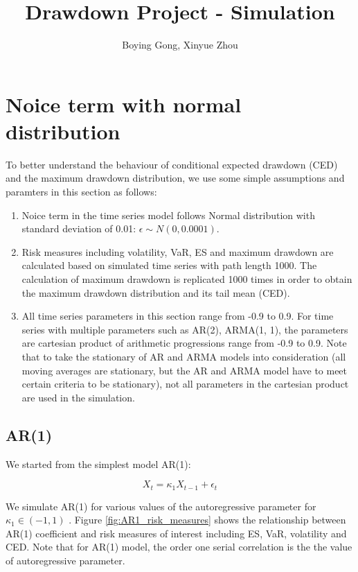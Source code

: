 \documentclass[11pt]{article}
\title{Drawdown Project - Simulation}
\author{Boying Gong, Xinyue Zhou}
\begin{document}
\maketitle

\tableofcontents

\clearpage

\section{Noice term with normal distribution}

To better understand the behaviour of conditional expected drawdown (CED) and the maximum drawdown distribution, we use some simple assumptions and paramters in this section as follows:

\begin{enumerate}
\item Noice term in the time series model follows Normal distribution with standard deviation of 0.01: $\epsilon \sim N(0, 0.0001)$.
\item Risk measures including volatility, VaR, ES and maximum drawdown are calculated based on simulated time series with path length 1000. The calculation of maximum drawdown is replicated 1000 times in order to obtain the maximum drawdown distribution and its tail mean (CED).
\item All time series parameters in this section range from -0.9 to 0.9. For time series with multiple parameters such as AR(2), ARMA(1, 1), the parameters are cartesian product of arithmetic progressions range from -0.9 to 0.9. Note that to take the stationary of AR and ARMA models into consideration (all moving averages are stationary, but the AR and ARMA model have to meet certain criteria to be stationary), not all parameters in the cartesian product are used in the simulation.
\end{enumerate}

\subsection{AR(1)} %

We started from the simplest model AR(1):

\begin{equation}
X_t = \kappa_1X_{t-1} + \epsilon_t
\end{equation}

We simulate AR(1) for various values of the autoregressive parameter for $\kappa_1 \in (-1, 1)$ . Figure \ref{fig:AR1_risk_measures} shows the relationship between AR(1) coefficient and risk measures of interest including ES, VaR, volatility and CED. Note that for AR(1) model, the order one serial correlation is the the value of autoregressive parameter.
\end{document}
